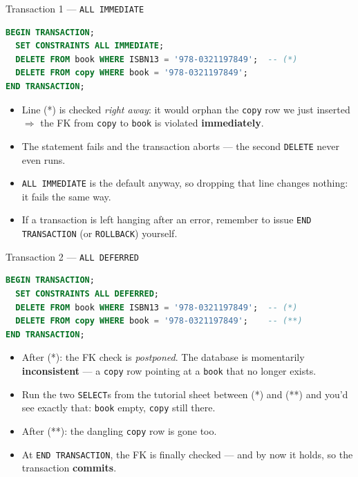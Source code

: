 \documentclass{beamer}
\begin{document}
\begin{frame}[fragile]{Transaction 1 --- \texttt{ALL IMMEDIATE}}
\small
\begin{lstlisting}[language=SQL]
BEGIN TRANSACTION;
  SET CONSTRAINTS ALL IMMEDIATE;
  DELETE FROM book WHERE ISBN13 = '978-0321197849';  -- (*)
  DELETE FROM copy WHERE book = '978-0321197849';
END TRANSACTION;
\end{lstlisting}
\begin{itemize}
  \item Line (*) is checked \emph{right away}: it would orphan the \texttt{copy} row we just inserted $\Rightarrow$ the FK from \texttt{copy} to \texttt{book} is violated \textbf{immediately}.
  \item The statement fails and the transaction aborts --- the second \texttt{DELETE} never even runs.
  \item \texttt{ALL IMMEDIATE} is the default anyway, so dropping that line changes nothing: it fails the same way.
  \item If a transaction is left hanging after an error, remember to issue \texttt{END TRANSACTION} (or \texttt{ROLLBACK}) yourself.
\end{itemize}
\end{frame}

\begin{frame}[fragile]{Transaction 2 --- \texttt{ALL DEFERRED}}
\small
\begin{lstlisting}[language=SQL]
BEGIN TRANSACTION;
  SET CONSTRAINTS ALL DEFERRED;
  DELETE FROM book WHERE ISBN13 = '978-0321197849';  -- (*)
  DELETE FROM copy WHERE book = '978-0321197849';    -- (**)
END TRANSACTION;
\end{lstlisting}
\begin{itemize}
  \item After (*): the FK check is \emph{postponed}. The database is momentarily \textbf{inconsistent} --- a \texttt{copy} row pointing at a \texttt{book} that no longer exists.
  \item Run the two \texttt{SELECT}s from the tutorial sheet between (*) and (**) and you'd see exactly that: \texttt{book} empty, \texttt{copy} still there.
  \item After (**): the dangling \texttt{copy} row is gone too.
  \item At \texttt{END TRANSACTION}, the FK is finally checked --- and by now it holds, so the transaction \textbf{commits}.
\end{itemize}
\end{frame}
\end{document}
